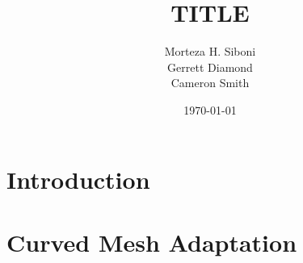 \documentclass[review,authoryear,12pt]{elsarticle_summary_report}
\begin{document}
\title{TITLE}%

\author[]{Morteza H. Siboni \\
Gerrett Diamond \\
Cameron Smith}



\date{\today}





\maketitle




\section{Introduction}

\section{Curved Mesh Adaptation}
\end{document}
